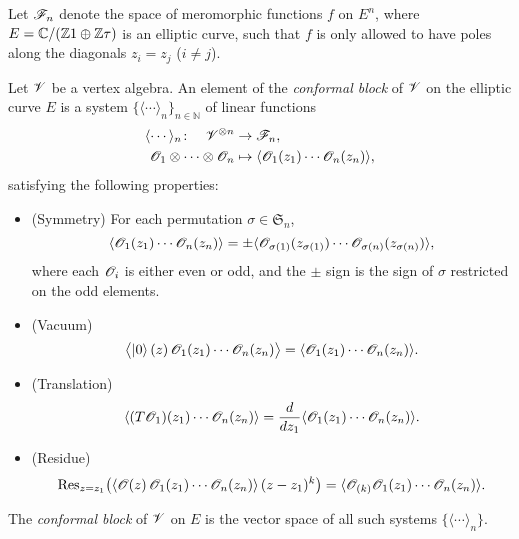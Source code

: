 \begin{definition}
    Let $\mathscr{F}_n$ denote the space of meromorphic functions $f$ on $E^n$,
    where $E = \mathbb{C} / (\mathbb{Z} 1 \oplus \mathbb{Z} \tau)$ is an elliptic curve,
    such that $f$ is only allowed to have poles
    along the diagonals $z_i = z_j$ ($i \neq j$).
    
    Let $\mathscr{V}$ be a vertex algebra.
    An element of the \emph{conformal block} of $\mathscr{V}$
    on the elliptic curve $E$
    is a system $\{ \langle \cdots \rangle_n \}_{n \in \mathbb{N}}$
    of linear functions
    \begin{align*}
        \langle \cdots \rangle_n \colon \quad
        \mathscr{V}^{\otimes n} & \to \mathscr{F}_n, \\
        \mathscr{O}_1 \otimes \cdots \otimes \mathscr{O}_n & \mapsto
        \langle \mathscr{O}_1 (z_1) \cdots \mathscr{O}_n (z_n) \rangle,
    \end{align*}
    satisfying the following properties:
    \begin{itemize}
        \item
            (Symmetry)
            For each permutation $\sigma \in \mathfrak{S}_n$,
            \[
                \langle \mathscr{O}_1 (z_1) \cdots \mathscr{O}_n (z_n) \rangle =
                \pm \langle \mathscr{O}_{\sigma (1)} (z_{\sigma (1)}) \cdots
                \mathscr{O}_{\sigma (n)} (z_{\sigma (n)}) \rangle,
            \]
            where each $\mathscr{O}_i$ is either even or odd,
            and the $\pm$ sign is the sign of $\sigma$
            restricted on the odd elements.
        \item
            (Vacuum)
            \[
                \bigl\langle
                    \mathinner{\mathopen{|}0\mathclose{\rangle}}(z) \,
                    \mathscr{O}_1 (z_1) \cdots \mathscr{O}_n (z_n)
                \bigr\rangle =
                \langle \mathscr{O}_1 (z_1) \cdots \mathscr{O}_n (z_n) \rangle.
            \]
        \item
            (Translation)
            \[
                \langle (T \mathscr{O}_1) (z_1) \cdots \mathscr{O}_n (z_n) \rangle =
                \frac{d}{d z_1}
                \langle \mathscr{O}_1 (z_1) \cdots \mathscr{O}_n (z_n) \rangle.
            \]
        \item
            (Residue)
            \[
                \operatorname{Res}_{z = z_1} \bigl(
                    \langle \mathscr{O} (z) \, \mathscr{O}_1 (z_1) \cdots \mathscr{O}_n (z_n) \rangle \,
                    (z - z_1)^k
                \bigr) =
                \langle \mathscr{O}_{(k)} \mathscr{O}_1 (z_1) \cdots \mathscr{O}_n (z_n) \rangle.
            \]
    \end{itemize}
    The \emph{conformal block} of $\mathscr{V}$ on $E$
    is the vector space of all such systems
    $\{ \langle \cdots \rangle_n \}$.
    \varqed
\end{definition}

